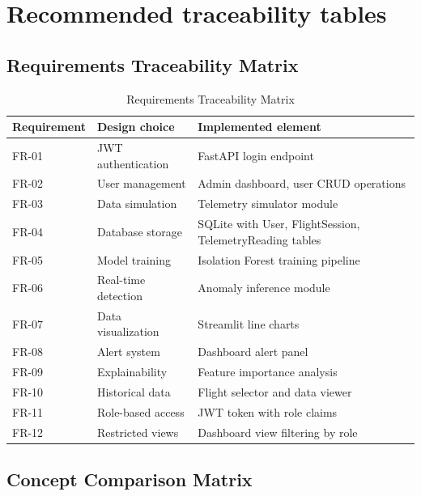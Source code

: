 \chapter{Recommended traceability tables}

\section{Requirements Traceability Matrix}

\begin{table}[H]
\centering
\caption{Requirements Traceability Matrix}
\begin{tabular}{|p{2cm}|p{2cm}|p{6cm}|}
\hline
\textbf{Requirement} & \textbf{Design choice} & \textbf{Implemented element} \\
\hline
FR-01 & JWT authentication & FastAPI login endpoint \\
\hline
FR-02 & User management & Admin dashboard, user CRUD operations \\
\hline
FR-03 & Data simulation & Telemetry simulator module \\
\hline
FR-04 & Database storage & SQLite with User, FlightSession, TelemetryReading tables \\
\hline
FR-05 & Model training & Isolation Forest training pipeline \\
\hline
FR-06 & Real-time detection & Anomaly inference module \\
\hline
FR-07 & Data visualization & Streamlit line charts \\
\hline
FR-08 & Alert system & Dashboard alert panel \\
\hline
FR-09 & Explainability & Feature importance analysis \\
\hline
FR-10 & Historical data & Flight selector and data viewer \\
\hline
FR-11 & Role-based access & JWT token with role claims \\
\hline
FR-12 & Restricted views & Dashboard view filtering by role \\
\hline
\end{tabular}
\end{table}

\section{Concept Comparison Matrix}


